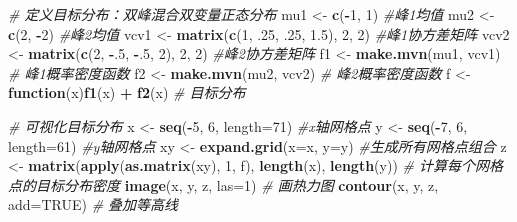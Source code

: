 \documentclass[
]{book}
\newenvironment{Shaded}{\begin{snugshade}}{\end{snugshade}}
\newcommand{\AttributeTok}[1]{\textcolor[rgb]{0.13,0.29,0.53}{#1}}
\newcommand{\CommentTok}[1]{\textcolor[rgb]{0.56,0.35,0.01}{\textit{#1}}}
\newcommand{\ConstantTok}[1]{\textcolor[rgb]{0.56,0.35,0.01}{#1}}
\newcommand{\ControlFlowTok}[1]{\textcolor[rgb]{0.13,0.29,0.53}{\textbf{#1}}}
\newcommand{\DecValTok}[1]{\textcolor[rgb]{0.00,0.00,0.81}{#1}}
\newcommand{\FloatTok}[1]{\textcolor[rgb]{0.00,0.00,0.81}{#1}}
\newcommand{\FunctionTok}[1]{\textcolor[rgb]{0.13,0.29,0.53}{\textbf{#1}}}
\newcommand{\NormalTok}[1]{#1}
\newcommand{\OtherTok}[1]{\textcolor[rgb]{0.56,0.35,0.01}{#1}}
\newcommand{\SpecialCharTok}[1]{\textcolor[rgb]{0.81,0.36,0.00}{\textbf{#1}}}
\begin{document}
\begin{Shaded}
\begin{Highlighting}[]
\CommentTok{\# 定义目标分布：双峰混合双变量正态分布}
\NormalTok{mu1 }\OtherTok{\textless{}{-}} \FunctionTok{c}\NormalTok{(}\SpecialCharTok{{-}}\DecValTok{1}\NormalTok{, }\DecValTok{1}\NormalTok{) }\CommentTok{\#峰1均值}
\NormalTok{mu2 }\OtherTok{\textless{}{-}} \FunctionTok{c}\NormalTok{(}\DecValTok{2}\NormalTok{, }\SpecialCharTok{{-}}\DecValTok{2}\NormalTok{) }\CommentTok{\#峰2均值}
\NormalTok{vcv1 }\OtherTok{\textless{}{-}} \FunctionTok{matrix}\NormalTok{(}\FunctionTok{c}\NormalTok{(}\DecValTok{1}\NormalTok{, .}\DecValTok{25}\NormalTok{, .}\DecValTok{25}\NormalTok{, }\FloatTok{1.5}\NormalTok{), }\DecValTok{2}\NormalTok{, }\DecValTok{2}\NormalTok{) }\CommentTok{\#峰1协方差矩阵}
\NormalTok{vcv2 }\OtherTok{\textless{}{-}} \FunctionTok{matrix}\NormalTok{(}\FunctionTok{c}\NormalTok{(}\DecValTok{2}\NormalTok{, }\SpecialCharTok{{-}}\NormalTok{.}\DecValTok{5}\NormalTok{, }\SpecialCharTok{{-}}\NormalTok{.}\DecValTok{5}\NormalTok{, }\DecValTok{2}\NormalTok{), }\DecValTok{2}\NormalTok{, }\DecValTok{2}\NormalTok{) }\CommentTok{\#峰2协方差矩阵}
\NormalTok{f1 }\OtherTok{\textless{}{-}} \FunctionTok{make.mvn}\NormalTok{(mu1, vcv1) }\CommentTok{\# 峰1概率密度函数}
\NormalTok{f2 }\OtherTok{\textless{}{-}} \FunctionTok{make.mvn}\NormalTok{(mu2, vcv2) }\CommentTok{\# 峰2概率密度函数}
\NormalTok{f }\OtherTok{\textless{}{-}} \ControlFlowTok{function}\NormalTok{(x)}\FunctionTok{f1}\NormalTok{(x) }\SpecialCharTok{+} \FunctionTok{f2}\NormalTok{(x) }\CommentTok{\# 目标分布}

\CommentTok{\# 可视化目标分布}
\NormalTok{x }\OtherTok{\textless{}{-}} \FunctionTok{seq}\NormalTok{(}\SpecialCharTok{{-}}\DecValTok{5}\NormalTok{, }\DecValTok{6}\NormalTok{, }\AttributeTok{length=}\DecValTok{71}\NormalTok{) }\CommentTok{\#x轴网格点}
\NormalTok{y }\OtherTok{\textless{}{-}} \FunctionTok{seq}\NormalTok{(}\SpecialCharTok{{-}}\DecValTok{7}\NormalTok{, }\DecValTok{6}\NormalTok{, }\AttributeTok{length=}\DecValTok{61}\NormalTok{) }\CommentTok{\#y轴网格点}
\NormalTok{xy }\OtherTok{\textless{}{-}} \FunctionTok{expand.grid}\NormalTok{(}\AttributeTok{x=}\NormalTok{x, }\AttributeTok{y=}\NormalTok{y) }\CommentTok{\#生成所有网格点组合}
\NormalTok{z }\OtherTok{\textless{}{-}} \FunctionTok{matrix}\NormalTok{(}\FunctionTok{apply}\NormalTok{(}\FunctionTok{as.matrix}\NormalTok{(xy), }\DecValTok{1}\NormalTok{, f), }\FunctionTok{length}\NormalTok{(x), }\FunctionTok{length}\NormalTok{(y))}
\CommentTok{\# 计算每个网格点的目标分布密度}
\FunctionTok{image}\NormalTok{(x, y, z, }\AttributeTok{las=}\DecValTok{1}\NormalTok{) }\CommentTok{\# 画热力图}
\FunctionTok{contour}\NormalTok{(x, y, z, }\AttributeTok{add=}\ConstantTok{TRUE}\NormalTok{) }\CommentTok{\# 叠加等高线}
\end{Highlighting}
\end{Shaded}
\end{document}
